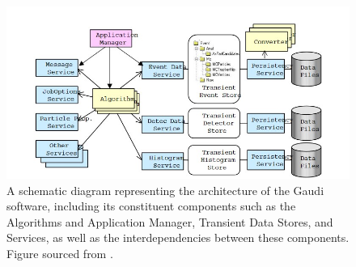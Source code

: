 \begin{figure}[H]
    \centering 
    \includegraphics[scale=0.8]{GaudiArchitecture.jpg}
    \caption{A schematic diagram representing the architecture of the Gaudi software, including its constituent components such as the Algorithms and Application Manager, Transient Data Stores, and Services, as well as the interdependencies between these components. Figure sourced from \cite{GaudiArchitecture}.}
    \label{GaudiArchitecture}
\end{figure}




